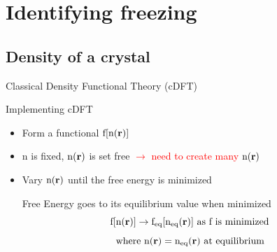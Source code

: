 \documentclass{beamer}
\renewcommand{\vec}[1]{\mathbf{#1}}
\begin{document}
\section*{Identifying freezing}
\subsection*{Density of a crystal}

\begin{frame}{Classical Density Functional Theory (cDFT)}
    \begin{block}{Implementing cDFT}
    \begin{itemize}
       \item Form a functional $\text f[\text n(\vec r)]$  \checkmark
       \item n is fixed, $\text n(\vec{r})$ is set free \textcolor{red}{$\rightarrow$ need to create many $\text n(\vec{r})$}
       \item Vary $\text n(\vec{r})$ until the free energy is minimized 
       
       Free Energy goes to its equilibrium value when minimized      
       \begin{displaymath}\text f[\text n(\vec r)]\rightarrow \text f_{\text{eq}}[\text n_{\text{eq}}(\vec r)]  \mbox{ as f is minimized} \end{displaymath}
       \begin{displaymath}{\mbox{where }  \text n(\vec{r}) = \text n_{\text{eq}}(\vec r)  \mbox{ at equilibrium}}\end{displaymath}              
       
     \end{itemize} 
     \end{block}
\end{frame}
\end{document}
